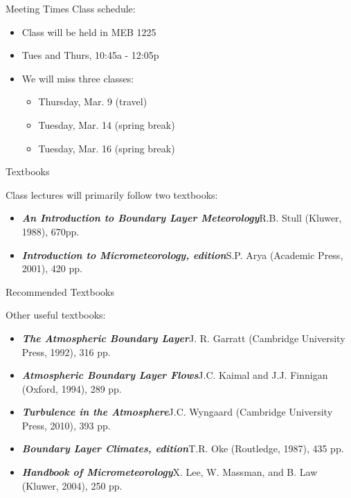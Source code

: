 
\begin{frame}{Meeting Times}
Class schedule:

\begin{itemize}
\item Class will be held in MEB 1225
\item Tues and Thurs, 10:45a - 12:05p
\item We will miss three classes:
\begin{itemize}
\item Thursday, Mar. 9 (travel)
\item Tuesday, Mar. 14 (spring break)
\item Tuesday, Mar. 16 (spring break)
\end{itemize}
\end{itemize}
\end{frame}


\begin{frame}{Textbooks}

Class lectures will primarily follow two textbooks:
\begin{itemize}
\item \textbf{\emph{An Introduction to Boundary Layer Meteorology}}\newline R.B. Stull (Kluwer, 1988), 670pp.
\item \textbf{\emph{Introduction to Micrometeorology,  edition}}\newline S.P. Arya (Academic Press, 2001), 420 pp.
\end{itemize}
\end{frame}


\begin{frame}{Recommended Textbooks}

Other useful textbooks:
\begin{itemize}
\item \textbf{\emph{The Atmospheric Boundary Layer}}\newline J. R. Garratt (Cambridge University Press, 1992), 316 pp.
\item \textbf{\emph{Atmospheric Boundary Layer Flows}}\newline J.C. Kaimal and J.J. Finnigan (Oxford, 1994), 289 pp.
\item \textbf{\emph{Turbulence in the Atmosphere}}\newline J.C. Wyngaard (Cambridge University Press, 2010), 393 pp.
\item \textbf{\emph{Boundary Layer Climates,  edition}}\newline T.R. Oke (Routledge, 1987), 435 pp.
\item \textbf{\emph{Handbook of Micrometeorology}}\newline X. Lee, W. Massman, and B. Law (Kluwer, 2004), 250 pp.
\end{itemize}
\end{frame}

